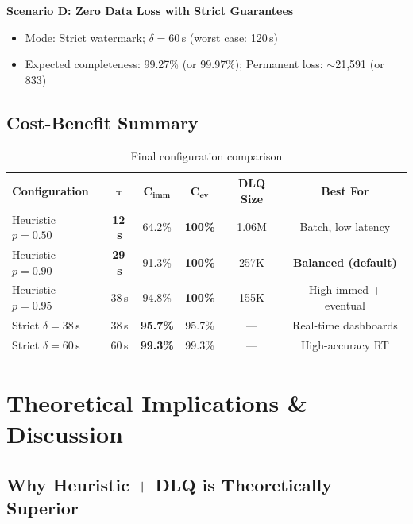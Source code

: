 \documentclass[11pt,a4paper]{article}
\begin{document}
\noindent\textbf{Scenario D: Zero Data Loss with Strict Guarantees}
\begin{itemize}[leftmargin=*, itemsep=1pt]
  \item Mode: Strict watermark; $\delta = 60$\,s (worst case: 120\,s)
  \item Expected completeness: 99.27\% (or 99.97\%); Permanent loss: $\sim$21,591 (or 833)
\end{itemize}

\subsection{Cost-Benefit Summary}

\begin{table}[H]
\centering
\caption{Final configuration comparison}
\label{tab:cost-benefit}
\begin{tabular}{lccccc}
\toprule
\textbf{Configuration} & $\bm{\tau}$ & $\mathbf{C_{\textbf{imm}}}$ & $\mathbf{C_{\textbf{ev}}}$ & \textbf{DLQ Size} & \textbf{Best For} \\
\midrule
Heuristic $p{=}0.50$ & \textbf{12\,s} & 64.2\% & \textbf{100\%} & 1.06M & Batch, low latency \\
Heuristic $p{=}0.90$ & \textbf{29\,s} & 91.3\% & \textbf{100\%} & 257K  & \textbf{Balanced (default)} \\
Heuristic $p{=}0.95$ & 38\,s & 94.8\% & \textbf{100\%} & 155K  & High-immed + eventual \\
Strict $\delta{=}38$\,s & 38\,s & \textbf{95.7\%} & 95.7\% & ---   & Real-time dashboards \\
Strict $\delta{=}60$\,s & 60\,s & \textbf{99.3\%} & 99.3\% & ---   & High-accuracy RT \\
\bottomrule
\end{tabular}
\end{table}

\section{Theoretical Implications \& Discussion}

\subsection{Why Heuristic $+$ DLQ is Theoretically Superior}
\end{document}
